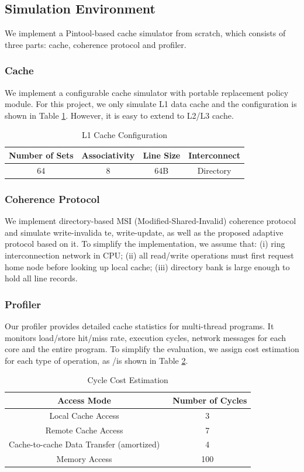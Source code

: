 \documentclass[11pt,conference]{IEEEtran}
\begin{document}
\subsection{Simulation Environment}
We implement a Pintool-based cache simulator from scratch, which consists of three parts: cache, coherence protocol and profiler.
\subsubsection{Cache}
We implement a configurable cache simulator with portable replacement policy module. For this project, we only simulate L1 data cache and the configuration is shown in Table \ref{l1_cache_config}. However, it is easy to extend to L2/L3 cache.

\begin{table}[!h]
\renewcommand{\arraystretch}{2.5}
\caption{L1 Cache Configuration}
\label{l1_cache_config}
\centering
\begin{tabular}{|c|c|c|c|}
\hline
Number of Sets & Associativity & Line Size & Interconnect \\
\hline
64 & 8 & 64B & Directory \\
\hline
\end{tabular}
\end{table}
\FloatBarrier

\subsubsection{Coherence Protocol}
We implement directory-based MSI (Modified-Shared-Invalid) coherence protocol and simulate write-invalida
te, write-update, as well as the proposed adaptive protocol based on it. To simplify the implementation, we assume that: (i) ring interconnection network in CPU; (ii) all read/write operations must first request home node before looking up local cache; (iii) directory bank is large enough to hold all line records.

\subsubsection{Profiler}
Our profiler provides detailed cache statistics for multi-thread programs. It monitors load/store hit/miss rate, execution cycles, network messages for each core and the entire program. To simplify the evaluation, we assign cost estimation for each type of operation, as
/is shown in Table \ref{cost_estimation}.

\begin{table}[!h]
\renewcommand{\arraystretch}{2.5}
\caption{Cycle Cost Estimation}
\label{cost_estimation}
\centering
\begin{tabular}{|c|c|}
\hline
Access Mode & \ Number of Cycles\\
\hline
Local Cache Access & 3\\
\hline
Remote Cache Access & 7\\
\hline
Cache-to-cache Data Transfer (amortized) & 4\\
\hline
Memory Access & 100\\
\hline
\end{tabular}
\end{table}
\FloatBarrier
\end{document}
